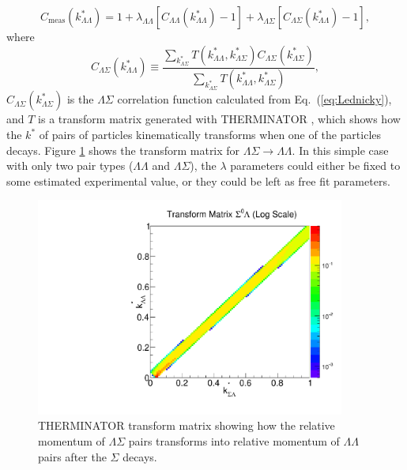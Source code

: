\begin{equation}
\label{eq:Residual}
C_{\mathrm{meas}}(k^*_{\Lambda\Lambda})= 1 + \lambda_{\Lambda\Lambda}[C_{\Lambda\Lambda}(k^*_{\Lambda\Lambda})-1]+\lambda_{\Lambda\Sigma}[C_{\Lambda\Sigma}(k^*_{\Lambda\Lambda})-1],
\end{equation}
where 
\begin{equation}
\label{eq:ResCorSmear}
C_{\Lambda\Sigma}(k^*_{\Lambda\Lambda}) \equiv \frac{\displaystyle\sum\limits_{k^*_{\Lambda\Sigma}}T(k^*_{\Lambda\Lambda},k^*_{\Lambda\Sigma})C_{\Lambda\Sigma}(k^*_{\Lambda\Sigma})}{\displaystyle\sum\limits_{k^*_{\Lambda\Sigma}}T(k^*_{\Lambda\Lambda},k^*_{\Lambda\Sigma})},
\end{equation}
$C_{\Lambda\Sigma}(k^*_{\Lambda\Sigma})$ is the $\Lambda\Sigma$ correlation function calculated from Eq.~(\ref{eq:Lednicky}), and $T$ is a transform matrix generated with THERMINATOR \cite{Chojnacki:2011hb}, which shows how the $k^*$ of pairs of particles kinematically transforms when one of the particles decays.  
Figure \ref{fig:TherminatorLS} shows the transform matrix for $\Lambda\Sigma \rightarrow \Lambda\Lambda$.  
In this simple case with only two pair types ($\Lambda\Lambda$ and $\Lambda\Sigma$), the $\lambda$ parameters could either be fixed to some estimated experimental value, or they could be left as free fit parameters.

\begin{figure}[hbtp]
\begin{center}
\includegraphics[width=24pc]{Figures/TransformMatrices/2016-7-20-TransformMatrixSigmaLambdaNormLog.pdf}
\end{center}
\caption[Transform matrix for $k^*_{\Lambda\Sigma} \rightarrow k^*_{\Lambda\Lambda}$]{THERMINATOR \cite{Chojnacki:2011hb} transform matrix showing how the relative momentum of $\Lambda\Sigma$ pairs transforms into relative momentum of $\Lambda\Lambda$ pairs after the $\Sigma$ decays.}
\label{fig:TherminatorLS}
\end{figure}


